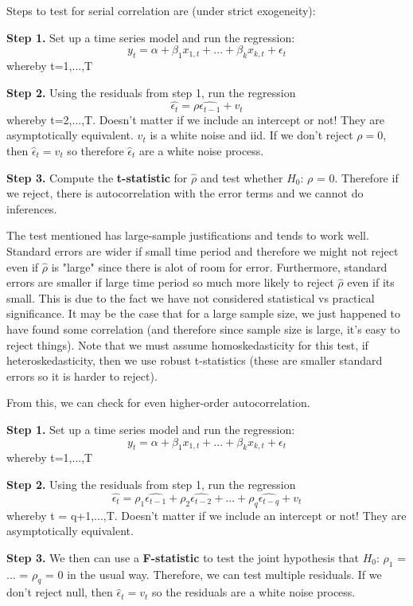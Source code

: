 \documentclass[11pt, oneside]{article}
\theoremstyle{definition}
\begin{document}
Steps to test for serial correlation are (under strict exogeneity):

\textbf{Step 1.} Set up a time series model and run the regression:
$$
y_t = \alpha + \beta_1 x_{1,t} + ... + \beta_k x_{k,t} + \epsilon_t
$$
whereby t=1,...,T

\textbf{Step 2.} Using the residuals from step 1, run the regression
$$
\hat{\epsilon_t} = \rho \hat{\epsilon_{t-1}} + v_t
$$
whereby t=2,...,T. Doesn't matter if we include an intercept or not! They are asymptotically equivalent. $v_t$ is a white noise and iid. If we don't reject $\rho = 0$, then $\hat{\epsilon}_t = v_t$ so therefore $\hat{\epsilon}_t$ are a white noise process.

\textbf{Step 3.} Compute the \textbf{t-statistic} for $\hat{\rho}$ and test whether $H_0$: $\rho$ = 0. Therefore if we reject, there is autocorrelation with the error terms and we cannot do inferences.

The test mentioned has large-sample justifications and tends to work well. Standard errors are wider if small time period and therefore we might not reject even if $\hat{\rho}$ is "large" since there is alot of room for error. Furthermore, standard errors are smaller if large time period so much more likely to reject $\hat{\rho}$ even if its small. This is due to the fact we have not considered statistical vs practical significance. It may be the case that for a large sample size, we just happened to have found some correlation (and therefore since sample size is large, it's easy to reject things). Note that we must assume homoskedasticity for this test, if heteroskedasticity, then we use robust t-statistics (these are smaller standard errors so it is harder to reject).


From this, we can check for even higher-order autocorrelation.

\textbf{Step 1.} Set up a time series model and run the regression:
$$
y_t = \alpha + \beta_1 x_{1,t} + ... + \beta_k x_{k,t} + \epsilon_t
$$
whereby t=1,...,T

\textbf{Step 2.} Using the residuals from step 1, run the regression
$$
\hat{\epsilon_t} = \rho_1 \hat{\epsilon_{t-1}} + \rho_2 \hat{\epsilon_{t-2}} + ... + \rho_q \hat{\epsilon_{t-q}} + v_t
$$
whereby t = q+1,...,T. Doesn't matter if we include an intercept or not! They are asymptotically equivalent.

\textbf{Step 3.} We then can use a \textbf{F-statistic} to test the joint hypothesis that $H_0$: $\rho_1$ = ... = $\rho_q$ = 0 in the usual way. Therefore, we can test multiple residuals. If we don't reject null, then $\hat{\epsilon}_t = v_t$ so the residuals are a white noise process.
\end{document}
